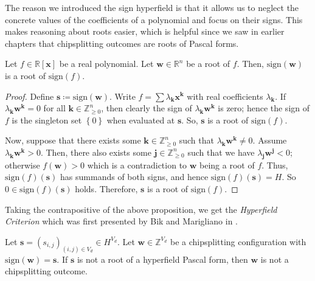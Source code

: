 The reason we introduced the sign hyperfield is that it allows us to neglect the concrete values of the coefficients of a polynomial and focus on their signs. This makes reasoning about roots easier, which is helpful since we saw in earlier chapters that chipsplitting outcomes are roots of Pascal forms.

\begin{proposition}\label{prop:sign-sikjsfnf}
    Let \( f \in \mathbb{R}[\mathbf{x}] \) be a real polynomial. Let \( \mathbf{w} \in \mathbb{R}^n \) be a root of \( f \). Then, \( \mathrm{sign}(\mathbf{w}) \) is a root of \( \mathrm{sign}(f) \).
\end{proposition}

\begin{proof}
    Define \( \mathbf{s} \coloneqq \mathrm{sign}(\mathbf{w}) \). Write \( f = \sum \lambda_{\mathbf{k}} \mathbf{x}^{\mathbf{k}} \) with real coefficients \( \lambda_{\mathbf{k}} \). If \( \lambda_{\mathbf{k}} \mathbf{w}^{\mathbf{k}} = 0 \) for all \( \mathbf{k} \in \mathbb{Z}^n_{\geq 0} \), then clearly the sign of \( \lambda_{\mathbf{k}} \mathbf{w}^{\mathbf{k}} \) is zero; hence the sign of \( f \) is the singleton set \( \left\{ 0 \right\} \) when evaluated at \( \mathbf{s} \). So, \( \mathbf{s} \) is a root of \( \mathrm{sign}(f) \).

    Now, suppose that there exists some \( \mathbf{k} \in \mathbb{Z}^n_{\geq 0} \) such that \( \lambda_{\mathbf{k}} \mathbf{w}^{\mathbf{k}} \neq 0 \). Assume \(  \lambda_{\mathbf{k}} \mathbf{w}^{\mathbf{k}} > 0 \). Then, there also exists some \( \mathbf{j} \in \mathbb{Z}^n_{\geq 0} \) such that we have \( \lambda_{\mathbf{j}} \mathbf{w}^{\mathbf{j}} < 0 \); otherwise \( f(\mathbf{w}) > 0 \) which is a contradiction to \( \mathbf{w} \) being a root of \( f \). Thus, \( \mathrm{sign}(f)(\mathbf{s}) \) has summands of both signs, and hence \( \mathrm{sign}(f)(\mathbf{s}) = H \). So \( 0 \in  \mathrm{sign}(f)(\mathbf{s}) \) holds. Therefore, \( \mathbf{s} \) is a root of \( \mathrm{sign}(f) \).
\end{proof}

Taking the contrapositive of the above proposition, we get the \emph{Hyperfield Criterion} which was first presented by Bik and Marigliano in \cite{bik2022classifying}.

\begin{proposition}
    Let \( \mathbf{s} = (s_{i,j})_{(i,j) \in V_d} \in H^{V_d} \). Let \( \mathbf{w} \in \mathbb{Z}^{V_d} \) be a chipsplitting configuration with \( \mathrm{sign}(\mathbf{w}) = \mathbf{s} \). If \( \mathbf{s} \) is not a root of a hyperfield Pascal form, then \( \mathbf{w} \) is not a chipsplitting outcome.
\end{proposition}

